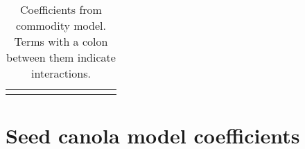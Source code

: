 \begin{landscape}
\begin{longtable}{|r|r|l|l|l|l|l|l|l|l|}
  \hline
  \caption{Coefficients from commodity model. Terms with a colon between them indicate interactions.}
  \label{tab:commCoefTab}  
\end{longtable}

\newpage

\section*{Seed canola model coefficients}


\end{landscape}
